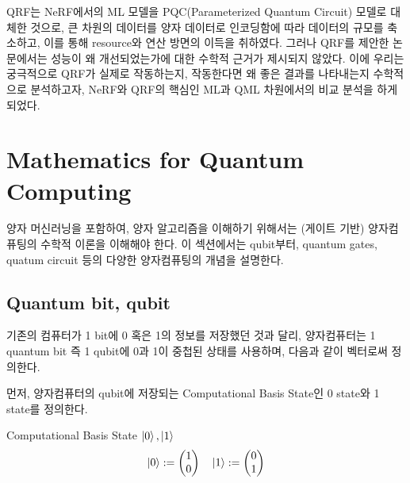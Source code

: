 QRF는 NeRF에서의 ML 모델을 PQC(Parameterized Quantum Circuit) 모델로 대체한 것으로, 큰 차원의 데이터를 양자 데이터로 인코딩함에 따라 데이터의 규모를 축소하고, 이를 통해 resource와 연산 방면의 이득을 취하였다. 그러나 QRF를 제안한 논문에서는 성능이 왜 개선되었는가에 대한 수학적 근거가 제시되지 않았다. 이에 우리는 궁극적으로 QRF가 실제로 작동하는지, 작동한다면 왜 좋은 결과를 나타내는지 수학적으로 분석하고자, NeRF와 QRF의 핵심인 ML과 QML 차원에서의 비교 분석을 하게 되었다.

\section{Mathematics for Quantum Computing}\label{ss:math for qc}


양자 머신러닝을 포함하여, 양자 알고리즘을 이해하기 위해서는 (게이트 기반) 양자컴퓨팅의 수학적 이론을 이해해야 한다. 이 섹션에서는 qubit부터, quantum gates, quatum circuit 등의 다양한 양자컴퓨팅의 개념을 설명한다.

\subsection{Quantum bit, qubit}


기존의 컴퓨터가 1 bit에 0 혹은 1의 정보를 저장했던 것과 달리, 양자컴퓨터는 1 quantum bit 즉 1 qubit에 0과 1이 중첩된 상태를 사용하며, 다음과 같이 벡터로써 정의한다.

먼저, 양자컴퓨터의 qubit에 저장되는 Computational Basis State인 0 state와 1 state를 정의한다.

\begin{definition}
Computational Basis State \( \ket{0}, \ket{1} \)
\[
    \ket{0} := \begin{pmatrix} 1 \\ 0 \end{pmatrix} \quad
    \ket{1} := \begin{pmatrix} 0 \\ 1 \end{pmatrix}
\]
\end{definition}

